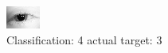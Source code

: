\begin{figure}[h!]
\begin{center}
\includegraphics[width=0.60\columnwidth]{figures/ID44_class_4_target_3.png}
\end{center}
\caption{ Classification: 4 actual target: 3}
\label{fig:ID44_class_4_target_3}
\end{figure}
